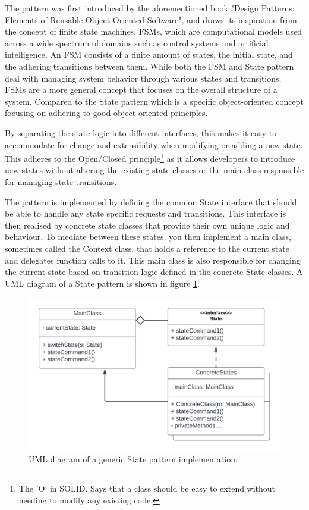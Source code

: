     The pattern was first introduced by the aforementioned book "Design Patterns: Elements of Reusable Object-Oriented Software", and draws its inspiration from the concept of finite state machines, FSMs, which are computational models used across a wide spectrum of domains such as control systems and artificial intelligence. An FSM consists of a finite amount of states, the initial state, and the adhering transitions between them. While both the FSM and State pattern deal with managing system behavior through various states and transitions, FSMs are a more general concept that focuses on the overall structure of a system. Compared to the State pattern which is a specific object-oriented concept focusing on adhering to good object-oriented principles.

    By separating the state logic into different interfaces, this makes it easy to accommodate for change and extensibility when modifying or adding a new state. This adheres to the Open/Closed principle\footnote{The 'O' in SOLID. Says that a class should be easy to extend without needing to modify any existing code.} as it allows developers to introduce new states without altering the existing state classes or the main class responsible for managing state transitions.

    The pattern is implemented by defining the common State interface that should be able to handle any state specific requests and transitions. This interface is then realised by concrete state classes that provide their own unique logic and behaviour. To mediate between these states, you then implement a main class, sometimes called the Context class, that holds a reference to the current state and delegates function calls to it. This main class is also responsible for changing the current state based on transition logic defined in the concrete State classes. A UML diagram of a State pattern is shown in figure \ref{fig:state-observer-uml}.
    
    \begin{figure}[H]
      \centering
      \includegraphics[scale=0.75]{Project_report/figures/theory/design_patterns/state_uml.png}
      \caption{UML diagram of a generic State pattern implementation.}
      \label{fig:state-observer-uml}
    \end{figure}